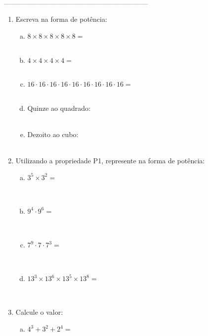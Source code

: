 \documentclass[a4paper,14pt]{article}
\begin{document}
\begin{multicols}{2}
    	\noindent\textsubscript{---------------------------------------------------------------------------}
    	\begin{enumerate}
    		\item Escreva na forma de potência:
    		\begin{enumerate}[a)]
    			\item $8 \times 8 \times 8 \times 8 \times 8 = $ \\\\
    			\item $4 \times 4 \times 4 \times 4 = $ \\\\
    			\item $16 \cdot 16 \cdot 16 \cdot 16 \cdot 16 \cdot 16 \cdot 16 \cdot 16 \cdot 16 = $ \\\\
    			\item Quinze ao quadrado: \\\\
    			\item Dezoito ao cubo: \\\\
    	    \end{enumerate}
            \item Utilizando a propriedade P1, represente na forma de potência:
            \begin{enumerate}[a)]
            	\item $3^5 \times 3^2 = $ \\\\\\
            	\item $9^4 \cdot 9^6 = $ \\\\\\
            	\item $7^9 \cdot 7 \cdot 7^3 = $ \\\\\\
            	\item $13^3 \times 13^6 \times 13^5 \times 13^8 = $ \\\\\\
            \end{enumerate}
            \item Calcule o valor:
            \begin{enumerate}[a)]
            	\item $4^3 + 3^2 + 2^4 = $ \\\\\\

\end{enumerate}
\end{enumerate}
\end{multicols}
\end{document}
